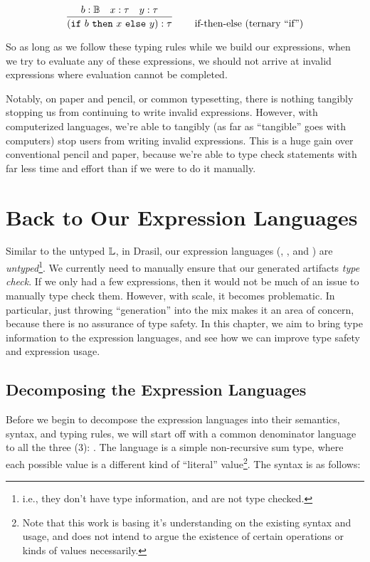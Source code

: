 \begin{equation}
      \left.
      \infer{(\texttt{if}\ b\ \texttt{then}\ x\ \texttt{else}\ y) : \tau}
      {b : \bb{B}  &  x : \tau  &  y : \tau}
      \right.
      \qquad
      \text{if-then-else (ternary ``if'')}
      \label{eq:exTR:ifThenElse}
\end{equation}

So as long as we follow these typing rules while we build our expressions, when
we try to evaluate any of these expressions, we should not arrive at invalid
expressions where evaluation cannot be completed.

Notably, on paper and pencil, or common typesetting, there is nothing tangibly
stopping us from continuing to write invalid expressions. However, with
computerized languages, we're able to tangibly (as far as ``tangible'' goes with
computers) stop users from writing invalid expressions. This is a huge gain over
conventional pencil and paper, because we're able to type check statements with
far less time and effort than if we were to do it manually.

\section{Back to Our Expression Languages}

Similar to the untyped \(\mathbb{L}\), in Drasil, our expression languages (\Expr{},
\CodeExpr{}, and \ModelExpr{}) are \textit{untyped}\footnote{i.e., they don't
      have type information, and are not type checked.}. We currently need to manually
ensure that our generated artifacts \textit{type check}. If we only had a few
expressions, then it would not be much of an issue to manually type check them.
However, with scale, it becomes problematic. In particular, just throwing
``generation'' into the mix makes it an area of concern, because there is no
assurance of type safety. In this chapter, we aim to bring type information to
the expression languages, and see how we can improve type safety and expression
usage.

\subsection{Decomposing the Expression Languages}

Before we begin to decompose the expression languages into their semantics,
syntax, and typing rules, we will start off with a common denominator language
to all the three (3): \Literal{}. The \Literal{} language is a simple
non-recursive sum type, where each possible value is a different kind of
``literal'' value\footnote{Note that this work is basing it's understanding on
      the existing syntax and usage, and does not intend to argue the existence of
      certain operations or kinds of values necessarily.}. The syntax is as follows:

